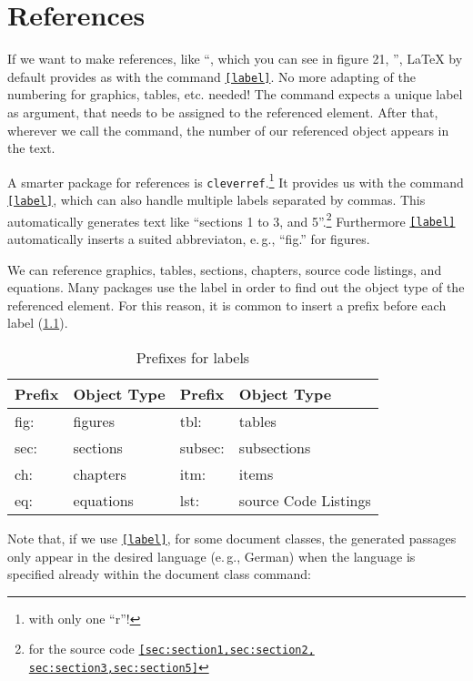 \chapter{References}
\label{sec:references}

If we want to make references, like \enquote{\textellipsis , which you can see in figure 21, \textellipsis}, \LaTeX{} by default provides as with the command \texttt{\ref{label}}. No more adapting of the numbering for graphics, tables, etc. needed!
The command expects a unique label as argument, that needs to be assigned to 
the referenced element. After that, wherever we call the command, the number of 
our referenced object appears in the text.

A smarter package for references is \texttt{cleverref}.\footnote{with only one \enquote{r}!}
It provides us with the command \texttt{\cref{label}}, which can also handle multiple labels separated by commas.
This automatically generates text like \enquote{sections 1 to 3, and 5}.\footnote{for the source code \texttt{\cref{sec:section1,sec:section2,
sec:section3,sec:section5}}}
Furthermore \texttt{\cref{label}} automatically inserts a suited abbreviaton, e.\,g., \enquote{fig.} for figures.

We can reference graphics, tables, sections, chapters, source code listings, and equations. 
Many packages use the label in order to find out the object type of the referenced element.
For this reason, it is common to insert a prefix before each label (\cref{lst:reference-prefixes}).

\begin{table}[H]
  \centering
  \begin{tabular}{@{}llll@{}}
    \toprule
    Prefix & Object Type & Prefix & Object Type \\ \midrule
    fig: & figures & tbl:    & tables            \\ 
    sec: & sections  & subsec: & subsections     \\
    ch:  & chapters     & itm:    & items \\
    eq:  & equations & lst:    & source Code Listings  \\ \bottomrule
  \end{tabular}
  \caption{Prefixes for labels}
  \label{lst:reference-prefixes}
\end{table}

Note that, if we use \texttt{\cref{label}}, for some document classes, the generated passages only appear in the desired language (e.\,g., German) when the language is specified already within the document class command:

